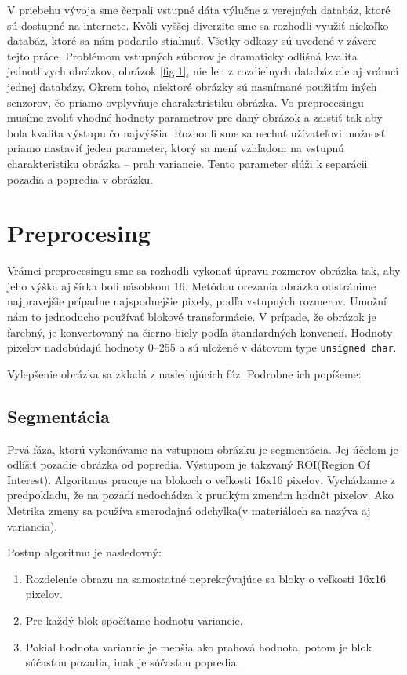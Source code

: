 \documentclass[11pt,a4paper]{article}
\begin{document}
V priebehu vývoja sme čerpali vstupné dáta výlučne z verejných databáz, ktoré sú dostupné na internete. Kvôli vyššej diverzite sme sa rozhodli využiť niekoľko databáz, ktoré sa nám podarilo stiahnuť. Všetky odkazy sú uvedené v závere tejto práce. Problémom vstupných súborov je dramaticky odlišná kvalita jednotlivych obrázkov, obrázok \ref{fig:1}, nie len z rozdielnych databáz ale aj vrámci jednej databázy. Okrem toho, niektoré obrázky sú nasnímané použitím iných senzorov, čo priamo ovplyvňuje charaketristiku obrázka. Vo preprocesingu musíme zvoliť vhodné hodnoty parametrov pre daný obrázok a zaistiť tak aby bola kvalita výstupu čo najvýššia. Rozhodli sme sa nechať užívateľovi možnosť priamo nastaviť jeden parameter, ktorý sa mení vzhľadom na vstupnú charakteristiku obrázka -- prah variancie. Tento parameter slúži k separácii pozadia a popredia v obrázku.

\section*{Preprocesing}
Vrámci preprocesingu sme sa rozhodli vykonať úpravu rozmerov obrázka tak, aby jeho výška aj šírka boli násobkom 16. Metódou orezania obrázka odstránime najpravejšie prípadne najspodnejšie pixely, podľa vstupných rozmerov. Umožní nám to jednoducho používať blokové transformácie. 
V prípade, že obrázok je farebný, je konvertovaný na čierno-biely podľa štandardných konvencií. Hodnoty pixelov nadobúdajú hodnoty 0--255 a sú uložené v dátovom type \texttt{unsigned char}.

Vylepšenie obrázka sa zkladá z nasledujúcich fáz. Podrobne ich popíšeme:

\subsection*{Segmentácia}
Prvá fáza, ktorú vykonávame na vstupnom obrázku je segmentácia. Jej účelom je odlíšiť pozadie obrázka od popredia. Výstupom je takzvaný ROI(Region Of Interest). Algoritmus pracuje na blokoch o veľkosti 16x16 pixelov. Vychádzame z predpokladu, že na pozadí nedochádza k prudkým zmenám hodnôt pixelov. Ako Metrika zmeny sa používa smerodajná odchylka(v materiáloch sa nazýva aj variancia).

Postup algoritmu je nasledovný:
\begin{enumerate}
	\item Rozdelenie obrazu na samostatné neprekrývajúce sa bloky o veľkosti 16x16 pixelov.
	\item Pre každý blok spočítame hodnotu variancie.
	\item Pokiaľ hodnota variancie je menšia ako prahová hodnota, potom je blok súčasťou pozadia, inak je súčasťou popredia.
\end{enumerate}
\end{document}

